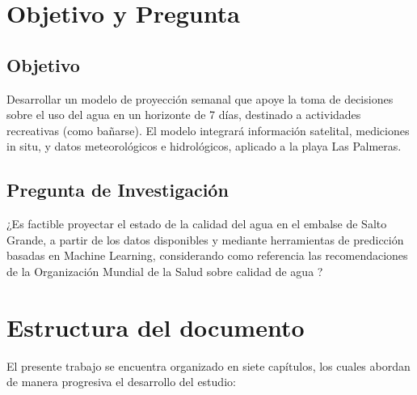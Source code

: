 \documentclass[
  11pt,
  pdftitle=TFI - Tschopp Joaquín S.,
  pdfauthor=Tschopp Joaquín S.,
  pdfcreator=LaTeX with hyperref,
]{report}  %
\begin{document}
\section{Objetivo y Pregunta}

\subsection{Objetivo}
Desarrollar un modelo de proyección semanal que apoye la toma de decisiones sobre el uso del agua en un horizonte de 7 días, destinado a actividades recreativas (como bañarse). El modelo integrará información satelital, mediciones in situ, y datos meteorológicos e hidrológicos, aplicado a la playa Las Palmeras.


\subsection{Pregunta de Investigación}
¿Es factible proyectar el estado de la calidad del agua en el embalse de Salto Grande, a partir de los datos disponibles y mediante herramientas de predicción basadas en Machine Learning, considerando como referencia las recomendaciones de la Organización Mundial de la Salud sobre calidad de agua \citep{WHO2021}?


\section{Estructura del documento}

El presente trabajo se encuentra organizado en siete capítulos, los cuales abordan de manera progresiva el desarrollo del estudio:
\end{document}
